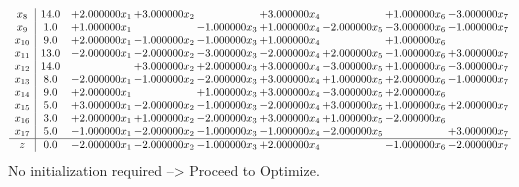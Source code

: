 \documentclass[10pt]{article}
\begin{document}
\[\begin{array}{c| c c@{\hskip 2pt} c@{\hskip 2pt} c@{\hskip 2pt} c@{\hskip 2pt} c@{\hskip 2pt} c@{\hskip 2pt} c@{\hskip 2pt} }
 x_{8}   &  14.0 & + 2.000000 x_{1} & + 3.000000 x_{2} &   & + 3.000000 x_{4} &   & + 1.000000 x_{6} & -3.000000 x_{7}\\
 x_{9}   &  1.0 & + 1.000000 x_{1} &   & -1.000000 x_{3} & + 1.000000 x_{4} & -2.000000 x_{5} & -3.000000 x_{6} & -1.000000 x_{7}\\
 x_{10}   &  9.0 & + 2.000000 x_{1} & -1.000000 x_{2} & -1.000000 x_{3} & + 1.000000 x_{4} &   & + 1.000000 x_{6} &   \\
 x_{11}   &  13.0 & -2.000000 x_{1} & -2.000000 x_{2} & -3.000000 x_{3} & -2.000000 x_{4} & + 2.000000 x_{5} & -1.000000 x_{6} & + 3.000000 x_{7}\\
 x_{12}   &  14.0  &   & + 3.000000 x_{2} & + 2.000000 x_{3} & + 3.000000 x_{4} & -3.000000 x_{5} & + 1.000000 x_{6} & -3.000000 x_{7}\\
 x_{13}   &  8.0 & -2.000000 x_{1} & -1.000000 x_{2} & -2.000000 x_{3} & + 3.000000 x_{4} & + 1.000000 x_{5} & + 2.000000 x_{6} & -1.000000 x_{7}\\
 x_{14}   &  9.0 & + 2.000000 x_{1} &   & + 1.000000 x_{3} & + 3.000000 x_{4} & -3.000000 x_{5} & + 2.000000 x_{6} &   \\
 x_{15}   &  5.0 & + 3.000000 x_{1} & -2.000000 x_{2} & -1.000000 x_{3} & -2.000000 x_{4} & + 3.000000 x_{5} & + 1.000000 x_{6} & + 2.000000 x_{7}\\
 x_{16}   &  3.0 & + 2.000000 x_{1} & + 1.000000 x_{2} & -2.000000 x_{3} & + 3.000000 x_{4} & + 1.000000 x_{5} & -2.000000 x_{6} &   \\
 x_{17}   &  5.0 & -1.000000 x_{1} & -2.000000 x_{2} & -1.000000 x_{3} & -1.000000 x_{4} & -2.000000 x_{5} &   & + 3.000000 x_{7}\\
\hline
z    &  0.0 & -2.000000 x_{1} & -2.000000 x_{2} & -1.000000 x_{3} & + 2.000000 x_{4} &   & -1.000000 x_{6} & -2.000000 x_{7}\\
\end{array}\]
No initialization required --> Proceed to Optimize. 
\end{document}
